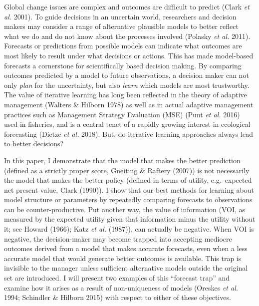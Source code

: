\documentclass[3p]{elsarticle} %
\begin{document}
\pagebreak

Global change issues are complex and outcomes are difficult to predict
(Clark \emph{et al.} 2001). To guide decisions in an uncertain world,
researchers and decision makers may consider a range of alternative
plausible models to better reflect what we do and do not know about the
processes involved (Polasky \emph{et al.} 2011). Forecasts or
predictions from possible models can indicate what outcomes are most
likely to result under what decisions or actions. This has made
model-based forecasts a cornerstone for scientifically based decision
making. By comparing outcomes predicted by a model to future
observations, a decision maker can not only \emph{plan} for the
uncertainty, but also \emph{learn} which models are most trustworthy.
The value of iterative learning has long been reflected in the theory of
adaptive management (Walters \& Hilborn 1978) as well as in actual
adaptive management practices such as Management Strategy Evaluation
(MSE) (Punt \emph{et al.} 2016) used in fisheries, and is a central
tenet of a rapidly growing interest in ecological forecasting (Dietze
\emph{et al.} 2018). But, do iterative learning approaches always lead
to better decisions?

In this paper, I demonstrate that the model that makes the better
prediction (defined as a strictly proper score, Gneiting \& Raftery
(2007)) is not necessarily the model that makes the better policy
(defined in terms of utility, e.g.~expected net present value, Clark
(1990)). I show that our best methods for learning about model structure
or parameters by repeatedly comparing forecasts to observations can be
counter-productive. Put another way, the value of information (VOI, as
measured by the expected utility given that information minus the
utility without it; see Howard (1966); Katz \emph{et al.} (1987)), can
actually be negative. When VOI is negative, the decision-maker may
become trapped into accepting mediocre outcomes derived from a model
that makes accurate forecasts, even when a less accurate model that
would generate better outcomes is available. This trap is invisible to
the manager unless sufficient alternative models outside the original
set are introduced. I will present two examples of this ``forecast
trap'' and examine how it arises as a result of non-uniqueness of models
(Oreskes \emph{et al.} 1994; Schindler \& Hilborn 2015) with respect to
either of these objectives.
\end{document}
